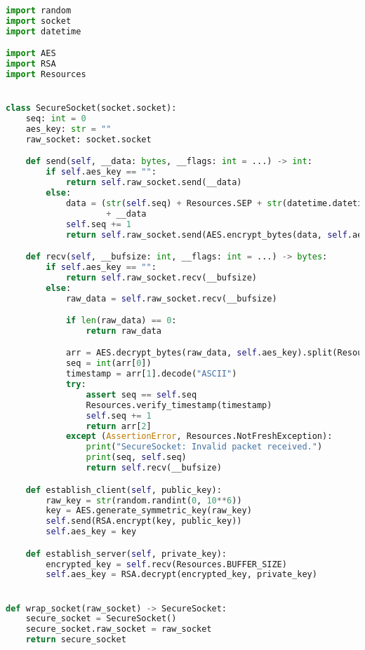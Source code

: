 \begin{latin}
\begin{lstlisting}[firstnumber=1, language=Python]
import random
import socket
import datetime

import AES
import RSA
import Resources


class SecureSocket(socket.socket):
    seq: int = 0
    aes_key: str = ""
    raw_socket: socket.socket

    def send(self, __data: bytes, __flags: int = ...) -> int:
        if self.aes_key == "":
            return self.raw_socket.send(__data)
        else:
            data = (str(self.seq) + Resources.SEP + str(datetime.datetime.now()) + Resources.SEP).encode('ASCII') \
                    + __data
            self.seq += 1
            return self.raw_socket.send(AES.encrypt_bytes(data, self.aes_key))

    def recv(self, __bufsize: int, __flags: int = ...) -> bytes:
        if self.aes_key == "":
            return self.raw_socket.recv(__bufsize)
        else:
            raw_data = self.raw_socket.recv(__bufsize)

            if len(raw_data) == 0:
                return raw_data

            arr = AES.decrypt_bytes(raw_data, self.aes_key).split(Resources.SEP.encode("ASCII"), maxsplit=3 - 1)
            seq = int(arr[0])
            timestamp = arr[1].decode("ASCII")
            try:
                assert seq == self.seq
                Resources.verify_timestamp(timestamp)
                self.seq += 1
                return arr[2]
            except (AssertionError, Resources.NotFreshException):
                print("SecureSocket: Invalid packet received.")
                print(seq, self.seq)
                return self.recv(__bufsize)

    def establish_client(self, public_key):
        raw_key = str(random.randint(0, 10**6))
        key = AES.generate_symmetric_key(raw_key)
        self.send(RSA.encrypt(key, public_key))
        self.aes_key = key

    def establish_server(self, private_key):
        encrypted_key = self.recv(Resources.BUFFER_SIZE)
        self.aes_key = RSA.decrypt(encrypted_key, private_key)


def wrap_socket(raw_socket) -> SecureSocket:
    secure_socket = SecureSocket()
    secure_socket.raw_socket = raw_socket
    return secure_socket

\end{lstlisting}
\end{latin}

